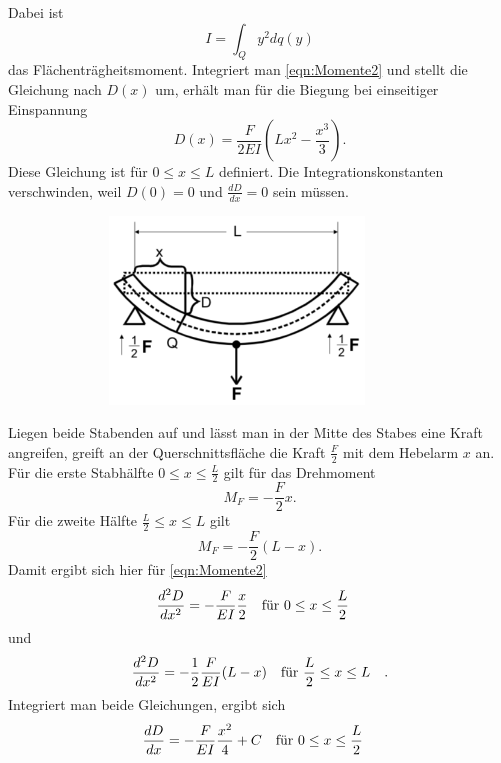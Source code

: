 Dabei ist
\begin{equation*}
I = \int_{Q} y^2 dq(y)
\end{equation*}
das Flächenträgheitsmoment.
Integriert man \eqref{eqn:Momente2} und stellt die Gleichung
nach $D(x)$ um, erhält man für die Biegung bei einseitiger Einspannung
\begin{equation}
D(x) = \frac{F}{2EI} (Lx^2- \frac{x^3}{3}).
\label{eqn:D1}
\end{equation}
Diese Gleichung ist für $0 \leq x \leq L$ definiert.
Die Integrationskonstanten verschwinden, weil $D(0) = 0$ und $\frac{dD}{dx} = 0$ sein müssen.

\begin{figure}
    \centering
\includegraphics[width= 10cm, height= 5cm]{./plots/abb2.png}
\caption{}
\label{fig:abb2}
\end{figure}
\noindent Liegen beide Stabenden auf und lässt man in der Mitte des Stabes
eine Kraft angreifen, greift an der Querschnittsfläche die Kraft
$\frac{F}{2}$ mit dem Hebelarm $x$ an. Für die erste Stabhälfte $0 \leq x \leq \frac{L}{2}$
gilt für das Drehmoment
\begin{equation*}
M_{F} = - \frac{F}{2} x.
\end{equation*}
Für die zweite Hälfte $\frac{L}{2} \leq x \leq L$ gilt
\begin{equation*}
M_{F} = - \frac{F}{2} (L-x).
\end{equation*}
Damit ergibt sich hier für \eqref{eqn:Momente2}
\begin{equation}
\frac{d^2D}{dx^2} = - \frac{F}{EI} \frac{x}{2} \qq{für $0 \leq x \leq \frac{L}{2}$}
\label{eqn:links}
\end{equation}
und
\begin{equation}
\frac{d^2D}{dx^2} = -\frac{1}{2} \frac{F}{EI} (L-x) \qq{für $\frac{L}{2} \leq x \leq L$}.
\label{eqn:rechts}
\end{equation}
Integriert man beide Gleichungen, ergibt sich 
\begin{equation*}
\frac{dD}{dx} = - \frac{F}{EI} \frac{x^2}{4} + C \qq{für $0 \leq x \leq \frac{L}{2}$}
\end{equation*}
